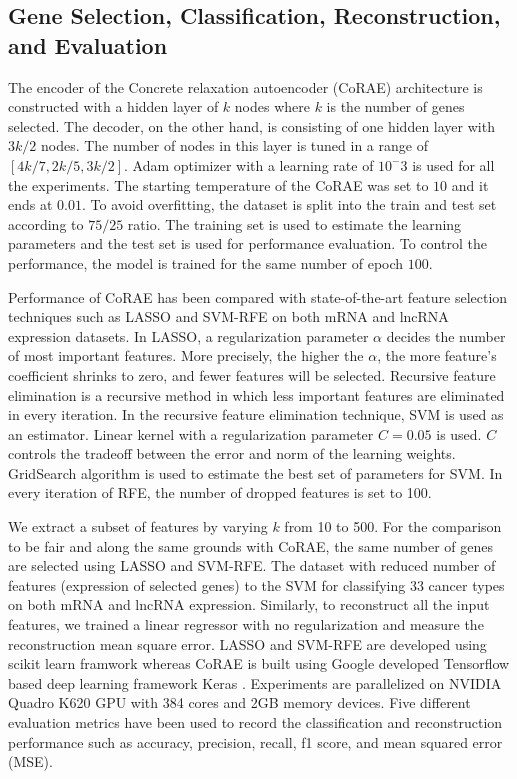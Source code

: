 \documentclass{bioinfo}
\begin{document}
\subsection{Gene Selection, Classification, Reconstruction, and Evaluation} \label{method-details}
The encoder of the Concrete relaxation autoencoder (CoRAE) architecture is constructed with a hidden layer of $k$ nodes where $k$ is the number of genes selected. The decoder, on the other hand, is consisting of one hidden layer with $3k/2$ nodes. 
The number of nodes in this layer is tuned in a range of $[4k/7, 2k/5, 3k/2]$. 
Adam optimizer with a learning rate of $10^-3$ is used for all the experiments. 
The starting temperature of the CoRAE was set to $10$ and it ends at $0.01$. 
To avoid overfitting, the dataset is split into the train and test set according to $75/25$ ratio. 
The training set is used to estimate the learning parameters and the test set is used for performance evaluation. 
To control the performance, the model is trained for the same number of epoch $100$.

 
Performance of CoRAE has been compared with state-of-the-art feature selection techniques such as LASSO and SVM-RFE on both mRNA and lncRNA expression datasets. 
In LASSO, a regularization parameter $\alpha$ decides the number of most important features. 
More precisely, the higher the $\alpha$, the more feature's coefficient shrinks to zero, and fewer features will be selected. Recursive feature elimination is a recursive method in which less important features are eliminated in every iteration. 
In the recursive feature elimination technique, SVM is used as an estimator. 
Linear kernel with a regularization parameter $C=0.05$ is used. $C$ controls the tradeoff between the error and norm of the learning weights. 
GridSearch algorithm is used to estimate the best set of parameters for SVM. 
In every iteration of RFE, the number of dropped features is set to 100. 

We extract a subset of features by varying $k$ from 10 to 500. For the comparison to be fair  and along the same grounds with CoRAE, the same number of genes are selected using LASSO and SVM-RFE. 
The dataset with reduced number of features (expression of selected genes) to the SVM for classifying 33 cancer types on both mRNA and lncRNA expression. Similarly, to reconstruct all the input features, we trained a linear regressor with no regularization and measure the reconstruction mean square error. 
LASSO and SVM-RFE are developed using scikit learn framwork \citep{scikit-learn} whereas CoRAE is built using Google developed Tensorflow \citep{tensorflow2015-whitepaper} based deep learning framework Keras \citep{chollet2015keras}. Experiments are parallelized on NVIDIA Quadro K620 GPU with 384 cores and 2GB memory devices. Five different evaluation metrics have been used to record the classification and reconstruction performance such as accuracy, precision, recall, f1 score, and mean squared error (MSE). 
\end{document}
